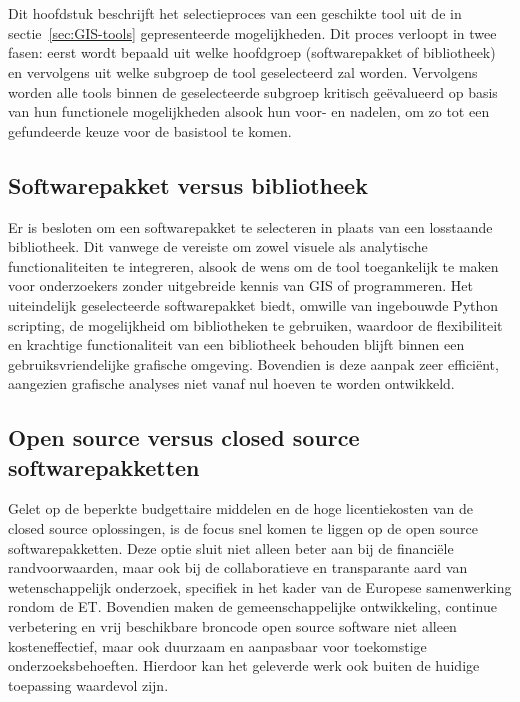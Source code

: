 
\chapter{}\label{ch:vergelijkingTools}

Dit hoofdstuk beschrijft het selectieproces van een geschikte tool uit de in sectie~\ref{sec:GIS-tools} gepresenteerde mogelijkheden. Dit proces verloopt in twee fasen: eerst wordt bepaald uit welke hoofdgroep (softwarepakket of bibliotheek) en vervolgens uit welke subgroep de tool geselecteerd zal worden. Vervolgens worden alle tools binnen de geselecteerde subgroep kritisch geëvalueerd op basis van hun functionele mogelijkheden alsook hun voor- en nadelen, om zo tot een gefundeerde keuze voor de basistool te komen.

\section{Softwarepakket versus bibliotheek}
Er is besloten om een softwarepakket te selecteren in plaats van een losstaande bibliotheek. Dit vanwege de vereiste om zowel visuele als analytische functionaliteiten te integreren, alsook de wens om de tool toegankelijk te maken voor onderzoekers zonder uitgebreide kennis van GIS of programmeren. Het uiteindelijk geselecteerde softwarepakket biedt, omwille van ingebouwde Python scripting, de mogelijkheid om bibliotheken te gebruiken, waardoor de flexibiliteit en krachtige functionaliteit van een bibliotheek behouden blijft binnen een gebruiksvriendelijke grafische omgeving. Bovendien is deze aanpak zeer efficiënt, aangezien grafische analyses niet vanaf nul hoeven te worden ontwikkeld.

\section{Open source versus closed source softwarepakketten}
Gelet op de beperkte budgettaire middelen en de hoge licentiekosten van de closed source oplossingen, is de focus snel komen te liggen op de open source softwarepakketten. Deze optie sluit niet alleen beter aan bij de financiële randvoorwaarden, maar ook bij de collaboratieve en transparante aard van wetenschappelijk onderzoek, specifiek in het kader van de Europese samenwerking rondom de ET. Bovendien maken de gemeenschappelijke ontwikkeling, continue verbetering en vrij beschikbare broncode open source software niet alleen kosteneffectief, maar ook duurzaam en aanpasbaar voor toekomstige onderzoeksbehoeften. Hierdoor kan het geleverde werk ook buiten de huidige toepassing waardevol zijn.

